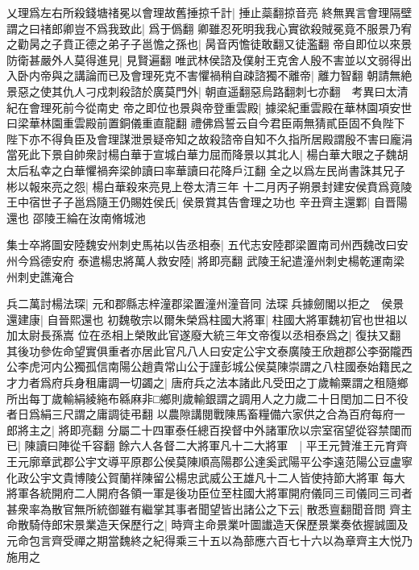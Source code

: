 乂理爲左右所殺錢塘禇冕以會理故舊捶掠千計|{
	捶止蘂翻掠音亮}
終無異言會理隔壁謂之曰禇郎卿豈不爲我致此|{
	爲于僞翻}
卿雖忍死明我我心實欲殺賊冕竟不服景乃宥之勸昺之子賁正德之弟子子邕憺之孫也|{
	昺音丙憺徒敢翻又徒濫翻}
帝自即位以來景防衛甚嚴外人莫得進見|{
	見賢遍翻}
唯武林侯諮及僕射王克舍人殷不害並以文弱得出入卧内帝與之講論而已及會理死克不害懼禍稍自疎諮獨不離帝|{
	離力智翻}
朝請無絶景惡之使其仇人刁戍刺殺諮於廣莫門外|{
	朝直遥翻惡烏路翻刺七亦翻　考異曰太清紀在會理死前今從南史}
帝之即位也景與帝登重雲殿|{
	據梁紀重雲殿在華林園項安世曰梁華林園重雲殿前置銅儀重直龍翻}
禮佛爲誓云自今君臣兩無猜貳臣固不負陛下陛下亦不得負臣及會理謀泄景疑帝知之故殺諮帝自知不久指所居殿謂殷不害曰龐涓當死此下景自帥衆討楊白華于宣城白華力屈而降景以其北人|{
	楊白華大眼之子魏胡太后私幸之白華懼禍奔梁帥讀曰率華讀曰花降戶江翻}
全之以爲左民尚書誅其兄子彬以報來亮之怨|{
	楊白華殺來亮見上卷太清三年}
十二月丙子朔景封建安侯賁爲竟陵王中宿世子子邕爲隨王仍賜姓侯氏|{
	侯景賞其告會理之功也}
辛丑齊主還鄴|{
	自晋陽還也}
邵陵王綸在汝南脩城池

集士卒將圖安陸魏安州刺史馬祐以告丞相泰|{
	五代志安陸郡梁置南司州西魏改曰安州今爲德安府}
泰遣楊忠將萬人救安陸|{
	將即亮翻}
武陵王紀遣潼州刺史楊乾運南梁州刺史譙淹合

兵二萬討楊法琛|{
	元和郡縣志梓潼郡梁置潼州潼音同}
法琛兵據劒閣以拒之　侯景還建康|{
	自晉熙還也}
初魏敬宗以爾朱榮爲柱國大將軍|{
	柱國大將軍魏初官也世祖以加太尉長孫嵩}
位在丞相上榮敗此官遂廢大統三年文帝復以丞相泰爲之|{
	復扶又翻}
其後功參佐命望實俱重者亦居此官凡八人曰安定公宇文泰廣陵王欣趙郡公李弼隴西公李虎河内公獨孤信南陽公趙貴常山公于謹彭城公侯莫陳崇謂之八柱國泰始籍民之才力者爲府兵身租庸調一切蠲之|{
	唐府兵之法本諸此凡受田之丁歲輸粟謂之租隨鄉所出每丁歲輸絹綾絁布緜麻非□鄉則歲輸銀謂之調用人之力歲二十日閏加二日不役者日爲絹三尺謂之庸調徒弔翻}
以農隙講閱戰陳馬畜糧備六家供之合為百府每府一郎將主之|{
	將即亮翻}
分屬二十四軍泰任總百揆督中外諸軍欣以宗室宿望從容禁闥而已|{
	陳讀曰陣從千容翻}
餘六人各督二大將軍凡十二大將軍　|{
	平王元贊淮王元育齊王元廓章武郡公宇文導平原郡公侯莫陳順高陽郡公達奚武陽平公李遠范陽公豆盧寧化政公宇文貴博陵公賀蘭祥陳留公楊忠武威公王雄凡十二人皆使持節大將軍}
每大將軍各統開府二人開府各領一軍是後功臣位至柱國大將軍開府儀同三司儀同三司者甚衆率為散官無所統御雖有繼掌其事者聞望皆出諸公之下云|{
	散悉亶翻聞音問}
齊主命散騎侍郎宋景業造天保歷行之|{
	時齊主命景業叶圖䜟造天保歷景業奏依握誠圖及元命包言齊受禪之期當魏終之紀得乘三十五以為蔀應六百七十六以為章齊主大悦乃施用之}


